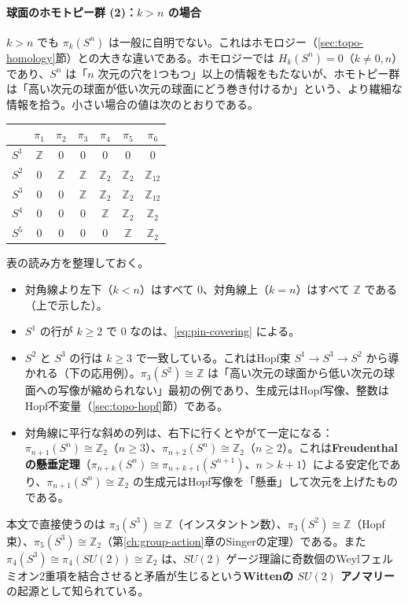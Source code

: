 \documentclass[uplatex, dvipdfmx, book]{jsbook}
\begin{document}
\paragraph{球面のホモトピー群 (2)：$k > n$ の場合}
$k > n$ でも $\pi_k(S^n)$ は一般に自明でない。これはホモロジー（\ref{sec:topo-homology}節）との大きな違いである。ホモロジーでは $H_k(S^n) = 0$（$k \neq 0, n$）であり、$S^n$ は「$n$ 次元の穴を1つもつ」以上の情報をもたないが、ホモトピー群は「高い次元の球面が低い次元の球面にどう巻き付けるか」という、より繊細な情報を拾う。小さい場合の値は次のとおりである。
\begin{center}
\begin{tabular}{c|cccccc}
    \hline
    & $\pi_1$ & $\pi_2$ & $\pi_3$ & $\pi_4$ & $\pi_5$ & $\pi_6$ \\
    \hline
    $S^1$ & $\mathbb{Z}$ & $0$ & $0$ & $0$ & $0$ & $0$ \\
    $S^2$ & $0$ & $\mathbb{Z}$ & $\mathbb{Z}$ & $\mathbb{Z}_2$ & $\mathbb{Z}_2$ & $\mathbb{Z}_{12}$ \\
    $S^3$ & $0$ & $0$ & $\mathbb{Z}$ & $\mathbb{Z}_2$ & $\mathbb{Z}_2$ & $\mathbb{Z}_{12}$ \\
    $S^4$ & $0$ & $0$ & $0$ & $\mathbb{Z}$ & $\mathbb{Z}_2$ & $\mathbb{Z}_2$ \\
    $S^5$ & $0$ & $0$ & $0$ & $0$ & $\mathbb{Z}$ & $\mathbb{Z}_2$ \\
    \hline
\end{tabular}
\end{center}
表の読み方を整理しておく。
\begin{itemize}
    \item 対角線より左下（$k < n$）はすべて $0$、対角線上（$k = n$）はすべて $\mathbb{Z}$ である（上で示した）。
    \item $S^1$ の行が $k \ge 2$ で $0$ なのは、\eqref{eq:pin-covering} による。
    \item $S^2$ と $S^3$ の行は $k \ge 3$ で一致している。これはHopf束 $S^1 \to S^3 \to S^2$ から導かれる（下の応用例）。$\pi_3(S^2) \cong \mathbb{Z}$ は「高い次元の球面から低い次元の球面への写像が縮められない」最初の例であり、生成元はHopf写像、整数はHopf不変量（\ref{sec:topo-hopf}節）である。
    \item 対角線に平行な斜めの列は、右下に行くとやがて一定になる：$\pi_{n+1}(S^n) \cong \mathbb{Z}_2$（$n \ge 3$）、$\pi_{n+2}(S^n) \cong \mathbb{Z}_2$（$n \ge 2$）。これは\textbf{Freudenthalの懸垂定理}（$\pi_{n+k}(S^n) \cong \pi_{n+k+1}(S^{n+1})$、$n > k + 1$）による安定化であり、$\pi_{n+1}(S^n) \cong \mathbb{Z}_2$ の生成元はHopf写像を「懸垂」して次元を上げたものである。
\end{itemize}
本文で直接使うのは $\pi_3(S^3) \cong \mathbb{Z}$（インスタントン数）、$\pi_3(S^2) \cong \mathbb{Z}$（Hopf束）、$\pi_5(S^3) \cong \mathbb{Z}_2$（第\ref{ch:group-action}章のSingerの定理）である。また $\pi_4(S^3) \cong \pi_4(SU(2)) \cong \mathbb{Z}_2$ は、$SU(2)$ ゲージ理論に奇数個のWeylフェルミオン2重項を結合させると矛盾が生じるという\textbf{Wittenの $SU(2)$ アノマリー}の起源として知られている。
\end{document}
